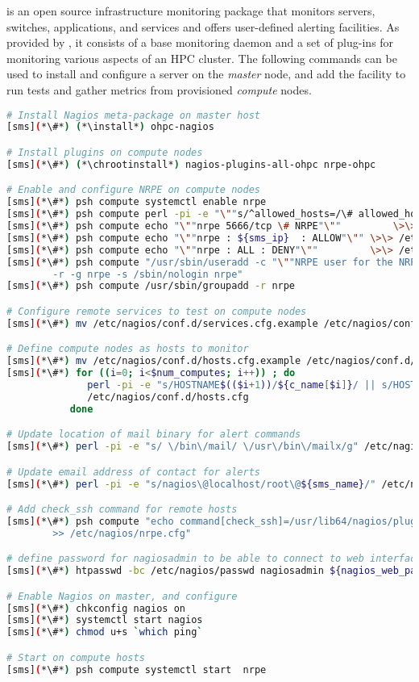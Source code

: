 \Nagios{} is an open source infrastructure monitoring package that monitors
servers, switches, applications, and services and offers user-defined alerting
facilities. As provided by \OHPC{}, it consists of a base monitoring daemon and
a set of plug-ins for monitoring various aspects of an HPC cluster. The
following commands can be used to install and configure a \Nagios{} server on the {\em
master} node, and add the facility to run tests and gather metrics from
provisioned {\em compute} nodes.

\begin{lstlisting}[language=bash,keywords={},upquote=true]
# Install Nagios meta-package on master host
[sms](*\#*) (*\install*) ohpc-nagios

# Install plugins on compute nodes
[sms](*\#*) (*\chrootinstall*) nagios-plugins-all-ohpc nrpe-ohpc

# Enable and configure NRPE on compute nodes
[sms](*\#*) psh compute systemctl enable nrpe
[sms](*\#*) psh compute perl -pi -e "\""s/^allowed_hosts=/\# allowed_hosts=/"\"" /etc/nagios/nrpe.cfg
[sms](*\#*) psh compute echo "\""nrpe 5666/tcp \# NRPE"\""         \>\> /etc/services
[sms](*\#*) psh compute echo "\""nrpe : ${sms_ip}  : ALLOW"\"" \>\> /etc/hosts.allow
[sms](*\#*) psh compute echo "\""nrpe : ALL : DENY"\""         \>\> /etc/hosts.allow
[sms](*\#*) psh compute "/usr/sbin/useradd -c "\""NRPE user for the NRPE service"\"" -d /var/run/nrpe \
        -r -g nrpe -s /sbin/nologin nrpe"
[sms](*\#*) psh compute /usr/sbin/groupadd -r nrpe

# Configure remote services to test on compute nodes
[sms](*\#*) mv /etc/nagios/conf.d/services.cfg.example /etc/nagios/conf.d/services.cfg

# Define compute nodes as hosts to monitor
[sms](*\#*) mv /etc/nagios/conf.d/hosts.cfg.example /etc/nagios/conf.d/hosts.cfg
[sms](*\#*) for ((i=0; i<$num_computes; i++)) ; do
              perl -pi -e "s/HOSTNAME$(($i+1))/${c_name[$i]}/ || s/HOST$(($i+1))_IP/${c_ip[$i]}/" \
              /etc/nagios/conf.d/hosts.cfg
           done

# Update location of mail binary for alert commands
[sms](*\#*) perl -pi -e "s/ \/bin\/mail/ \/usr\/bin\/mailx/g" /etc/nagios/objects/commands.cfg

# Update email address of contact for alerts
[sms](*\#*) perl -pi -e "s/nagios\@localhost/root\@${sms_name}/" /etc/nagios/objects/contacts.cfg

# Add check_ssh command for remote hosts
[sms](*\#*) psh compute "echo command[check_ssh]=/usr/lib64/nagios/plugins/check_ssh localhost \
        >> /etc/nagios/nrpe.cfg"

# define password for nagiosadmin to be able to connect to web interface
[sms](*\#*) htpasswd -bc /etc/nagios/passwd nagiosadmin ${nagios_web_password}

# Enable Nagios on master, and configure
[sms](*\#*) chkconfig nagios on
[sms](*\#*) systemctl start nagios
[sms](*\#*) chmod u+s `which ping`

# Start on compute hosts
[sms](*\#*) psh compute systemctl start  nrpe
\end{lstlisting}


